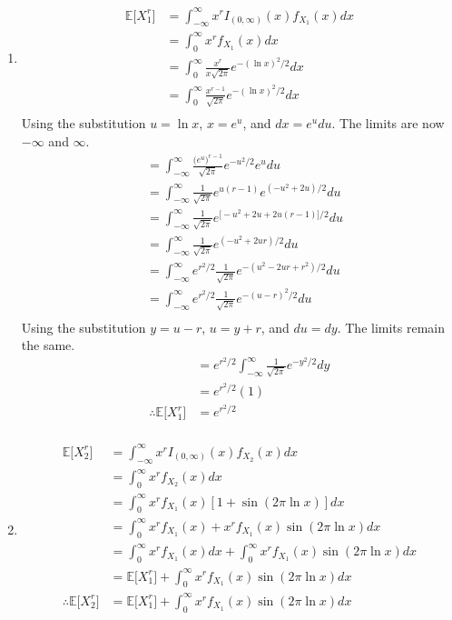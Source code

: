 \documentclass[a4paper]{article}
\newcommand{\e}{\mathbb{E}}
\newcommand{\ds}{\displaystyle}
\begin{document}
\begin{enumerate}
\begin{enumerate}
		\pagebreak

		\item
		\begin{align*}
			\e \big[X_1^r \big] & = \int^{\infty}_{-\infty} x^rI_{(0,\infty)}(x)f_{X_1}(x)dx\\
			& = \int^{\infty}_{0} x^rf_{X_1}(x)dx\\
			& = \int^{\infty}_{0} \frac{x^r}{x\sqrt{2\pi}}e^{-(\ln{x})^2/2}dx\\
			& = \int^{\infty}_{0} \frac{x^{r-1}}{\sqrt{2\pi}}e^{-(\ln{x})^2/2}dx\\
		\end{align*}
		Using the substitution $\ds{u = \ln{x}}$, $\ds{x = e^u}$, and $\ds{dx = e^udu}$. The limits are now $\ds{-\infty}$ and $\ds{\infty}$.
		\begin{align*}
			& = \int^{\infty}_{-\infty} \frac{\big(e^u \big)^{r-1}}{\sqrt{2\pi}}e^{-u^2/2}e^udu\\
			& = \int^{\infty}_{-\infty} \frac{1}{\sqrt{2\pi}}e^{u(r-1)}e^{(-u^2 + 2u)/2}du\\
			& = \int^{\infty}_{-\infty} \frac{1}{\sqrt{2\pi}}e^{\big[-u^2 + 2u + 2u(r-1)\big]/2}du\\
			& = \int^{\infty}_{-\infty} \frac{1}{\sqrt{2\pi}}e^{(-u^2 + 2ur)/2}du\\
			& = \int^{\infty}_{-\infty} e^{r^2/2}\frac{1}{\sqrt{2\pi}}e^{-(u^2 - 2ur + r^2)/2}du\\
			& = \int^{\infty}_{-\infty} e^{r^2/2}\frac{1}{\sqrt{2\pi}}e^{-(u - r)^2/2}du\\
		\end{align*}
		Using the substitution $\ds{y = u - r}$, $\ds{u = y + r}$, and $\ds{du = dy}$. The limits remain the same.
		\begin{align*}
			& = e^{r^2/2} \int^{\infty}_{-\infty} \frac{1}{\sqrt{2\pi}}e^{-y^2/2}dy\\
			& = e^{r^2/2} (1)\\
			\therefore \e \big[X_1^r \big] & = e^{r^2/2}\\
		\end{align*}

		\item
		\begin{align*}
			\e \big[X_2^r \big] & = \int^{\infty}_{-\infty} x^rI_{(0,\infty)}(x)f_{X_2}(x)dx\\
			& = \int^{\infty}_{0} x^rf_{X_2}(x)dx\\
			& = \int^{\infty}_{0} x^rf_{X_1}(x)[1 + \sin(2\pi \ln{x})]dx\\
			& = \int^{\infty}_{0} x^rf_{X_1}(x) + x^rf_{X_1}(x)\sin(2\pi \ln{x})dx\\
			& = \int^{\infty}_{0} x^rf_{X_1}(x)dx + \int^{\infty}_{0}x^rf_{X_1}(x)\sin(2\pi \ln{x})dx\\
			& = \e \big[X_1^r \big] + \int^{\infty}_{0}x^rf_{X_1}(x)\sin(2\pi \ln{x})dx\\
			\therefore \e \big[X_2^r \big] & = \e \big[X_1^r \big] + \int^{\infty}_{0}x^rf_{X_1}(x)\sin(2\pi \ln{x})dx\\
		\end{align*}


\end{enumerate}
\end{enumerate}
\end{document}
